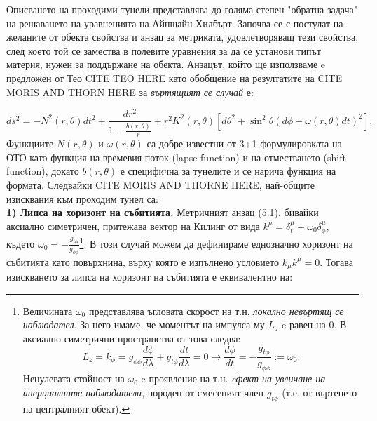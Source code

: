 Описването на проходими тунели представлява до голяма степен "обратна задача"$\,$ на решаването на уравненията на Айнщайн-Хилбърт. Започва се с постулат на желаните от обекта свойства и анзац за метриката, удовлетворяващ тези свойства, след което той се замества в полевите уравнения за да се установи типът материя, нужен за поддържане на обекта. Анзацът, който ще използваме e предложен от Тео CITE TEO HERE като обобщение на резултатите на CITE MORIS AND THORN HERE за \emph{въртящият се случай} е:
	
\begin{equation}
	ds^2 = -N^2(r,\theta)dt^2 + \frac{dr^2}{1 - \frac{b(r,\theta)}{r}} + r^2K^2(r,\theta)\left[d\theta^2 + \sin^2\theta\left(d\phi + \omega(r,\theta)dt\right)^2\right].
\end{equation}
Функциите $N(r,\theta)$ и $\omega(r,\theta)$ са добре известни от 3+1 формулировката на ОТО като функция на времевия поток (lapse function) и на отместването (shift function), докато $b(r,\theta)$ е специфична за тунелите и се нарича функция на формата. Следвайки CITE MORIS AND THORNE HERE, най-общите изисквания към проходим тунел са:\\

\noindent\textbf{1) Липса на хоризонт на събитията.} Метричният анзац (5.1), бивайки аксиално симетричен, притежава вектор на Килинг от вида $k^\mu = \delta_t^\mu + \omega_0\delta^\mu_\phi$, където $\omega_0 = -\frac{g_{t\phi}}{g_{\phi\phi}}$\footnote{Величината $\omega_0$ представлява ъгловата скорост на т.н. \emph{локално невъртящ се наблюдател}. За него имаме, че моментът на импулса му $L_z$ e равен на 0. В аксиално-симетрични пространства от това следва:
	\begin{equation*}
		L_z = k_\phi = g_{\phi\phi}\frac{d\phi}{d\lambda} + g_{t\phi}\frac{dt}{d\lambda} = 0\rightarrow \frac{d\phi}{dt} = -\frac{g_{t\phi}}{g_{\phi\phi}} := \omega_0.
	\end{equation*}
	Ненулевата стойност на $\omega_0$ e проявление на т.н. \emph{eфект на увличане на инерциалните наблюдатели}, породен от смесеният член $g_{t\phi}$ (т.е. от въртенето на централният обект).}. В този случай можем да дефинираме еднозначно хоризонт на събитията като повърхнина, върху която е изпълнено условието $k_\mu k^\mu = 0$. Тогава изискването за липса на хоризонт на събитията е еквивалентно на:

